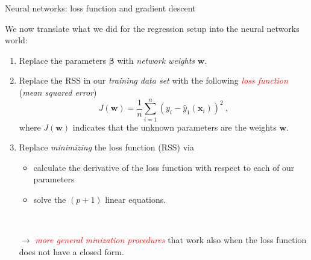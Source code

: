 \documentclass[10pt,ignorenonframetext,]{beamer}
\providecommand{\tightlist}{%
  \setlength{\itemsep}{0pt}\setlength{\parskip}{0pt}}
\begin{document}
\begin{frame}

\begin{block}{Neural networks: loss function and gradient descent}

\vspace{4mm}

We now translate what we did for the regression setup into the neural
networks world: \vspace{2mm}

\begin{enumerate}
\item
  Replace the parameters \(\boldsymbol\beta\) with \emph{network
  weights} \(\boldsymbol w\).
\item
  Replace the RSS in our \emph{training data set} with the following
  \emph{\textcolor{red}{loss function}} (\emph{mean squared error})
  \[ J({\boldsymbol w})=\frac{1}{n}\sum_{i=1}^n (y_i-{\hat{y}_1({\boldsymbol x}_i)})^2 \ ,\]
  where \(J({\boldsymbol w})\) indicates that the unknown parameters are
  the weights \({\boldsymbol w}\).
\end{enumerate}

\end{block}

\end{frame}

\begin{frame}

\begin{enumerate}
\setcounter{enumi}{2}
\tightlist
\item
  Replace \emph{minimizing} the loss function (RSS) via

  \begin{itemize}
  \tightlist
  \item
    calculate the derivative of the loss function with respect to each
    of our parameters
  \item
    solve the \((p+1)\) linear equations.
  \end{itemize}

  \(~\)

  \(\rightarrow\)
  \emph{\textcolor{red}{more general minization procedures}} that work
  also when the loss function does not have a closed form.
\end{enumerate}

\end{frame}
\end{document}
